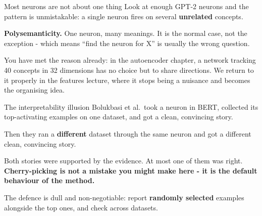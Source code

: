 \documentclass[aspectratio=169]{beamer}
\newcommand{\keybox}[1]{%
  \begin{tcolorbox}[colback=armblue!8, colframe=armblue, boxrule=0.6pt, arc=2pt]
  #1
  \end{tcolorbox}}
\newcommand{\trapbox}[1]{%
  \begin{tcolorbox}[colback=armred!8, colframe=armred, boxrule=0.6pt, arc=2pt]
  #1
  \end{tcolorbox}}
\begin{document}
\begin{frame}{Most neurons are not about one thing}
  \vspace{0.6em}
  Look at enough GPT-2 neurons and the pattern is unmistakable: a single neuron fires on
  several \textbf{unrelated} concepts.

  \vspace{0.8em}
  \keybox{\textbf{Polysemanticity.} One neuron, many meanings. It is the normal case, not the
  exception - which means ``find the neuron for X'' is usually the wrong question.}

  \vspace{0.9em}
  You have met the reason already: in the autoencoder chapter, a network tracking 40 concepts in
  32 dimensions has no choice but to share directions. We return to it properly in the features
  lecture,
  where it stops being a nuisance and becomes the organising idea.
\end{frame}

\begin{frame}{The interpretability illusion}
  \vspace{0.6em}
  Bolukbasi et al.\ took a neuron in BERT, collected its top-activating examples on one dataset,
  and got a clean, convincing story.

  \vspace{0.5em}
  Then they ran a \textbf{different} dataset through the same neuron and got a different clean,
  convincing story.

  \vspace{0.9em}
  \trapbox{Both stories were supported by the evidence. At most one of them was right.
  \textbf{Cherry-picking is not a mistake you might make here - it is the default behaviour of
  the method.}}

  \vspace{0.8em}
  The defence is dull and non-negotiable: report \textbf{randomly selected} examples alongside
  the top ones, and check across datasets.
\end{frame}
\end{document}
